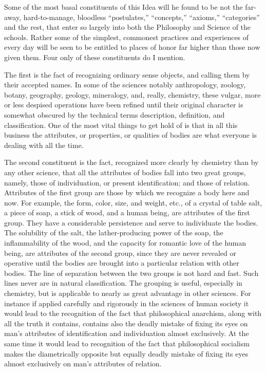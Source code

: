 \documentclass[a4paper, 11pt, oneside, polutonikogreek, english, landscape]{article}
\begin{document}
Some of the most basal constituents of this Idea will he found to be not the far-away, hard-to-manage, bloodless ``postulates,'' ``concepts,'' ``axioms,'' ``categories'' and the rest, that enter so largely into both the Philosophy and Science of the schools. Rather some of the simplest, commonest practices and experiences of every day will be seen to be entitled to places of honor far higher than those now given them. Four only of these constituents do I mention.

The first is the fact of recognizing ordinary sense objects, and calling them by their accepted names. In some of the sciences notably anthropology, zoology, botany, geography, geology, mineralogy, and, really, chemistry, these vulgar, more or less despised operations have been refined until their original character is somewhat obscured by the technical terms description, definition, and classification. One of the most vital things to get hold of is that in all this business the attributes, or properties, or qualities of bodies are what everyone is dealing with all the time.

The second constituent is the fact, recognized more clearly by chemistry than by any other science, that all the attributes of bodies fall into two great groups, namely, those of individuation, or present identification; and those of relation. Attributes of the first group are those by which we recognize a body here and now. For example, the form, color, size, and weight, etc., of a crystal of table salt, a piece of soap, a stick of wood, and a human being, are attributes of the first group. They have a considerable persistence and serve to individuate the bodies. The solubility of the salt, the lather-producing power of the soap, the inflammability of the wood, and the capacity for romantic love of the human being, are attributes of the second group, since they are never revealed or operative until the bodies are brought into a particular relation with other bodies. The line of separation between the two groups is not hard and fast. Such lines never are in natural classification. The grouping is useful, especially in chemistry, but is applicable to nearly as great advantage in other sciences. For instance if applied carefully and rigorously in the sciences of human society it would lead to the recognition of the fact that philosophical anarchism, along with all the truth it contains, contains also the deadly mistake of fixing its eyes on man's attributes of identification and individuation almost exclusively. At the same time it would lead to recognition of the fact that philosophical socialism makes the diametrically opposite but equally deadly mistake of fixing its eyes almost exclusively on man's attributes of relation.
\end{document}
